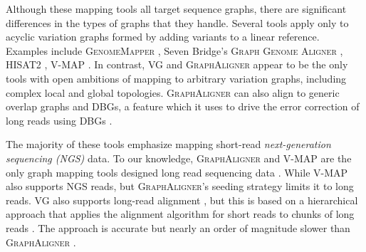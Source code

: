 Although these mapping tools all target sequence graphs, there are significant differences in the types of graphs that they handle.
Several tools apply only to acyclic variation graphs formed by adding variants to a linear reference.
Examples include \textsc{GenomeMapper} \cite{Schneeberger_2009}, Seven Bridge's \textsc{Graph Genome Aligner} \cite{Rakocevic_2019}, \textsc{HISAT2} \cite{Kim_2019}, \textsc{V-MAP} \cite{Vaddadi_2019}.
In contrast, \textsc{VG} \cite{Garrison_2019} and \textsc{GraphAligner} \cite{Rautiainen_2019b} appear to be the only tools with open ambitions of mapping to arbitrary variation graphs, including complex local and global topologies.
\textsc{GraphAligner} can also align to generic overlap graphs and DBGs, a feature which it uses to drive the error correction of long reads using DBGs \cite{Heydari_2018, Fu2019ErrorCorrectionSurvey}.

The majority of these tools emphasize mapping short-read \emph{next-generation sequencing (NGS)} data. 
To our knowledge, \textsc{GraphAligner} and \textsc{V-MAP} are the only graph mapping tools designed long read sequencing data \cite{Rautiainen_2019b, Vaddadi_2019}.
While \textsc{V-MAP} also supports NGS reads, but \textsc{GraphAligner}'s seeding strategy limits it to long reads.
\textsc{VG} also supports long-read alignment \cite{Garrison_2018}, but this is based on a hierarchical approach that applies the alignment algorithm for short reads to chunks of long reads \cite{Garrison_2019}.
The approach is accurate but nearly an order of magnitude slower than \textsc{GraphAligner} \cite{Rautiainen_2019b}.

